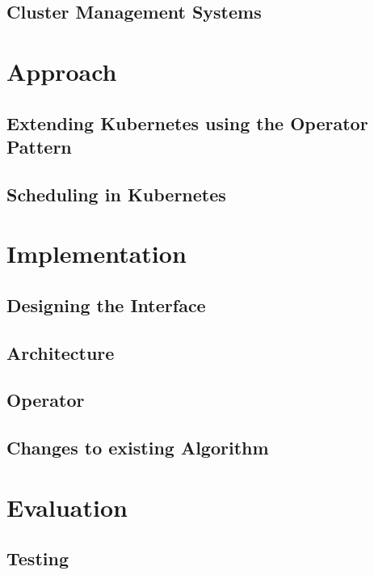 \section{Cluster Management Systems}


\chapter{Approach}

\section{Extending Kubernetes using the Operator Pattern}

\section{Scheduling in Kubernetes}



\chapter{Implementation}
\section{Designing the Interface}

\section{Architecture}

\section{Operator}

\section{Changes to existing Algorithm}


\chapter{Evaluation}
\section{Testing}

